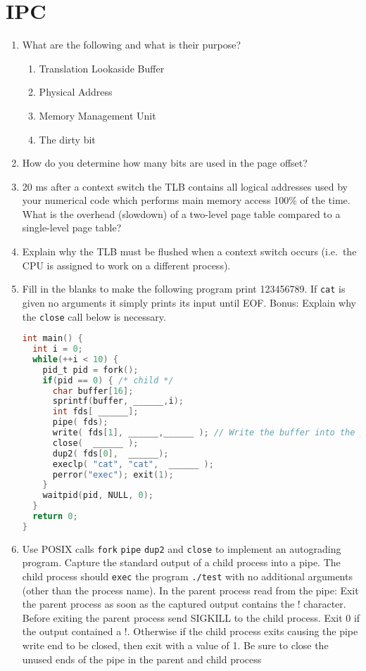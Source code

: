 \section{IPC}

\begin{enumerate}

\item What are the following and what is their purpose?
  \begin{enumerate}
  \item Translation Lookaside Buffer
  \item Physical Address
  \item Memory Management Unit
  \item The dirty bit
  \end{enumerate}

\item How do you determine how many bits are used in the page offset?

\item 20 ms after a context switch the TLB contains all logical addresses used by your numerical code which performs main memory access 100\% of the time. What is the overhead (slowdown) of a two-level page table compared to a single-level page table?

\item Explain why the TLB must be flushed when a context switch occurs (i.e.~the CPU is assigned to work on a different process).

\item Fill in the blanks to make the following program print 123456789. If \texttt{cat} is given no arguments it simply prints its input until EOF. Bonus: Explain why the \texttt{close} call below is necessary.

\begin{lstlisting}[language=C]
int main() {
  int i = 0;
  while(++i < 10) {
    pid_t pid = fork();
    if(pid == 0) { /* child */
      char buffer[16];
      sprintf(buffer, ______,i);
      int fds[ ______];
      pipe( fds);
      write( fds[1], ______,______ ); // Write the buffer into the pipe
      close(  ______ );
      dup2( fds[0],  ______);
      execlp( "cat", "cat",  ______ );
      perror("exec"); exit(1);
    }
    waitpid(pid, NULL, 0);
  }
  return 0;
}
\end{lstlisting}

\item Use POSIX calls \texttt{fork} \texttt{pipe} \texttt{dup2} and \texttt{close} to implement an autograding program. Capture the standard output of a child process into a pipe. The child process should \texttt{exec} the program \texttt{./test} with no additional arguments (other than the process name). In the parent process read from the pipe: Exit the parent process as soon as the captured output contains the ! character. Before exiting the parent process send SIGKILL to the child process. Exit 0 if the output contained a !. Otherwise if the child process exits causing the pipe write end to be closed, then exit with a value of 1. Be sure to close the unused ends of the pipe in the parent and child process


\end{enumerate}
